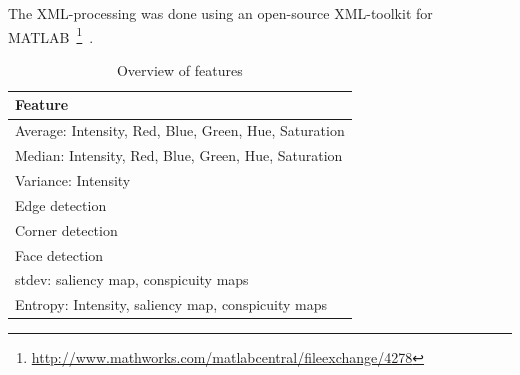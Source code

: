 The XML-processing was done using an open-source XML-toolkit for MATLAB~\footnote{\url{http://www.mathworks.com/matlabcentral/fileexchange/4278}}~\cite{geusebroek2005six}.

\begin{table}[htb]
    \centering
    \begin{tabular}	{ | l | } 
		\hline
		Feature \\
		\hline
		Average: Intensity, Red, Blue, Green, Hue, Saturation \\
		\hline
		Median: Intensity, Red, Blue, Green, Hue, Saturation \\
		\hline
		Variance: Intensity \\
		\hline
		Edge detection \\
		\hline 
		Corner detection \\
		\hline
		Face detection \\
		\hline
		stdev: saliency map, conspicuity maps \\
		\hline
		Entropy: Intensity, saliency map, conspicuity maps \\
		\hline
\hline
    \end{tabular}
    \caption{Overview of features}
    \label{tab:featurelist}
\end{table}

